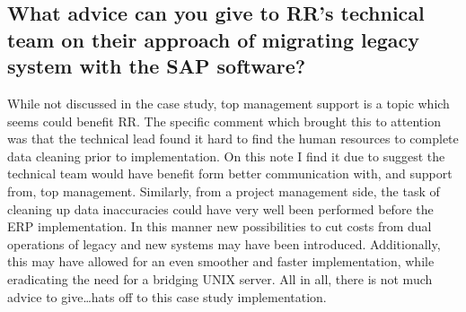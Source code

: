 \documentclass{article}
\begin{document}
\subsection{What advice can you give to RR's technical team on their approach of migrating
legacy system with the SAP software?}
While not discussed in the case study, top management support is a topic which seems could benefit RR. 
The specific comment which brought this to attention was that the technical lead found it hard to find the human resources to complete data cleaning prior to implementation. 
On this note I find it due to suggest the technical team would have benefit form better communication with, and support from, top management. 
Similarly, from a project management side, the task of cleaning up data inaccuracies could have very well been performed before the ERP implementation. 
In this manner new possibilities to cut costs from dual operations of legacy and new systems may have been introduced. 
Additionally, this may have allowed for an even smoother and faster implementation, while eradicating the need for a bridging UNIX server. 
All in all, there is not much advice to give\dots hats off to this case study implementation. 
\end{document}
